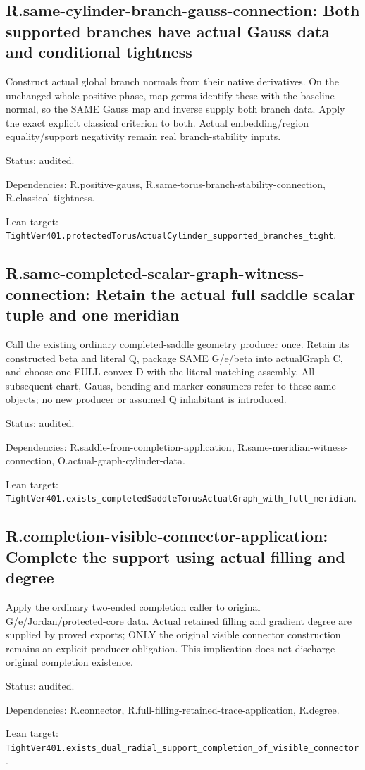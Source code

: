 \documentclass{article}
\begin{document}
\subsection*{R.same-cylinder-branch-gauss-connection: Both supported branches have actual Gauss data and conditional tightness}
Construct actual global branch normals from their native derivatives. On the unchanged whole positive phase, map germs identify these with the baseline normal, so the SAME Gauss map and inverse supply both branch data. Apply the exact explicit classical criterion to both. Actual embedding/region equality/support negativity remain real branch-stability inputs.
\par Status: audited.
\par Dependencies: R.positive-gauss, R.same-torus-branch-stability-connection, R.classical-tightness.
\par Lean target: \texttt{TightVer401.protectedTorusActualCylinder\_supported\_branches\_tight}.
\subsection*{R.same-completed-scalar-graph-witness-connection: Retain the actual full saddle scalar tuple and one meridian}
Call the existing ordinary completed-saddle geometry producer once. Retain its constructed beta and literal Q, package SAME G/e/beta into actualGraph C, and choose one FULL convex D with the literal matching assembly. All subsequent chart, Gauss, bending and marker consumers refer to these same objects; no new producer or assumed Q inhabitant is introduced.
\par Status: audited.
\par Dependencies: R.saddle-from-completion-application, R.same-meridian-witness-connection, O.actual-graph-cylinder-data.
\par Lean target: \texttt{TightVer401.exists\_completedSaddleTorusActualGraph\_with\_full\_meridian}.
\subsection*{R.completion-visible-connector-application: Complete the support using actual filling and degree}
Apply the ordinary two-ended completion caller to original G/e/Jordan/protected-core data. Actual retained filling and gradient degree are supplied by proved exports; ONLY the original visible connector construction remains an explicit producer obligation. This implication does not discharge original completion existence.
\par Status: audited.
\par Dependencies: R.connector, R.full-filling-retained-trace-application, R.degree.
\par Lean target: \texttt{TightVer401.exists\_dual\_radial\_support\_completion\_of\_visible\_connector}.
\end{document}
